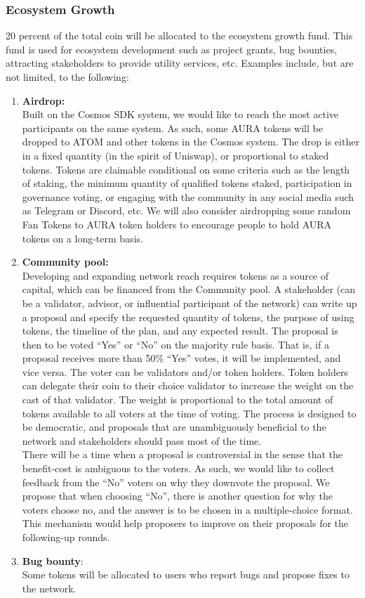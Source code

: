 \documentclass[11pt, titlepage]{article}
\begin{document}
\subsubsection{Ecosystem Growth}
20 percent of the total coin will be allocated to the ecosystem growth fund. This fund is used for ecosystem development such as project grants, bug bounties, attracting stakeholders to provide utility services, etc. Examples include, but are not limited, to the following: 

\begin{enumerate}
\item \textbf{Airdrop:} \\ 
Built on the Cosmos SDK system, we would like to reach the most active participants on the same system. As such, some AURA tokens will be dropped to ATOM and other tokens in the Cosmos system. The drop is either in a fixed quantity (in the spirit of Uniswap), or proportional to staked tokens. Tokens are claimable conditional on some criteria such as the length of staking, the minimum quantity of qualified tokens staked, participation in governance voting, or engaging with the community in any social media such as Telegram or Discord, etc. We will also consider airdropping some random Fan Tokens to AURA token holders to encourage people to hold AURA tokens on a long-term basis.
\item \textbf{Community pool:} \\
Developing and expanding network reach requires tokens as a source of capital, which can be financed from the Community pool. A stakeholder (can be a validator, advisor, or influential participant of the network) can write up a proposal and specify the requested quantity of tokens, the purpose of using tokens, the timeline of the plan, and any expected result.  
The proposal is then to be voted “Yes” or “No” on the majority rule basis. That is, if a proposal receives more than 50\% “Yes” votes, it will be implemented, and vice versa. The voter can be validators and/or token holders. Token holders can delegate their coin to their choice validator to increase the weight on the cast of that validator. The weight is proportional to the total amount of tokens available to all voters at the time of voting. The process is designed to be democratic, and proposals that are unambiguously beneficial to the network and stakeholders should pass most of the time.\\
There will be a time when a proposal is controversial in the sense that the benefit-cost is ambiguous to the voters. As such, we would like to collect feedback from the “No” voters on why they downvote the proposal. We propose that when choosing “No”, there is another question for why the voters choose no, and the answer is to be chosen in a multiple-choice format. This mechanism would help proposers to improve on their proposals for the following-up rounds.
 
\item \textbf{Bug bounty}: \\ 
Some tokens will be allocated to users who report bugs and propose fixes to the network.

\end{enumerate}
\end{document}
